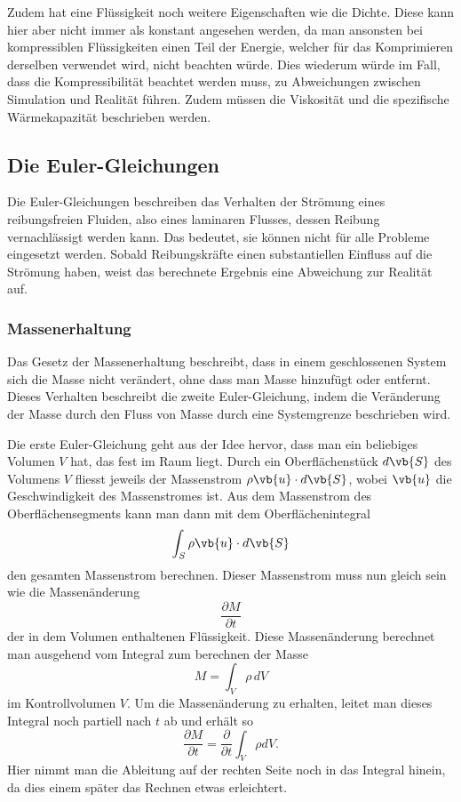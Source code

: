 Zudem hat eine Flüssigkeit noch weitere Eigenschaften wie die Dichte. 
Diese kann hier aber nicht immer als konstant angesehen werden, da man ansonsten bei kompressiblen Flüssigkeiten einen Teil der Energie, welcher für das Komprimieren derselben verwendet wird, nicht beachten würde.
Dies wiederum würde im Fall, dass die Kompressibilität beachtet werden muss, zu Abweichungen zwischen Simulation und Realität führen.
Zudem müssen die Viskosität und die spezifische Wärmekapazität beschrieben werden.

\subsection{Die Euler-Gleichungen}
Die Euler-Gleichungen beschreiben das Verhalten der Strömung eines reibungsfreien Fluiden, also eines laminaren Flusses, dessen Reibung vernachlässigt werden kann. 
Das bedeutet, sie können nicht für alle Probleme eingesetzt werden. 
Sobald Reibungskräfte einen substantiellen Einfluss auf die Strömung haben, weist das berechnete Ergebnis eine Abweichung zur Realität auf.

\subsubsection{Massenerhaltung}
Das Gesetz der Massenerhaltung beschreibt, dass in einem geschlossenen System sich die Masse nicht verändert, ohne dass man Masse hinzufügt oder entfernt. 
Dieses Verhalten beschreibt die zweite Euler-Gleichung, indem die Veränderung der Masse durch den Fluss von Masse durch eine Systemgrenze beschrieben wird.

Die erste Euler-Gleichung geht aus der Idee hervor, dass man ein beliebiges Volumen $V$ hat, das fest im Raum liegt. Durch ein Oberflächenstück 
$d \vb{S} $ 
des Volumens 
$V$
 fliesst jeweils der Massenstrom 
$ \rho\vb{u}\cdot d\vb{S}$, wobei $\vb{u}$ die Geschwindigkeit des Massenstromes ist.
Aus dem Massenstrom des Oberflächensegments kann man dann mit dem Oberflächenintegral 
\[\int_{S}\rho\vb{u}\cdot d\vb{S}\]
den gesamten Massenstrom berechnen. Dieser Massenstrom muss nun gleich sein wie die Massenänderung 
\[\frac{\partial M}{\partial t}\]
der in dem Volumen enthaltenen Flüssigkeit.
Diese Massenänderung berechnet man ausgehend vom Integral zum berechnen der Masse 
\[M 
= 
\int_{V} \rho \, dV\]
im Kontrollvolumen $V$.
Um die Massenänderung zu erhalten, leitet man dieses Integral noch partiell nach $t$ ab und erhält so
\[\frac{\partial M}{\partial t}
=
\frac{\partial }{\partial t} \int_{V}\rho dV.\]
Hier nimmt man die Ableitung auf der rechten Seite noch in das Integral hinein, da dies einem später das Rechnen etwas erleichtert.

